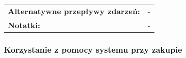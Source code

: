 \documentclass[a4paper,20pt]{article}
\begin{document}
\begin{center}
\begin{tabularx}{\textwidth}[t]{XX}
\quad \textbf{Alternatywne przepływy zdarzeń:} & 
\begin{minipage}[t]{\linewidth}%
-
\end{minipage}\\


\quad \textbf{Notatki:} & 
\begin{minipage}[t]{\linewidth}%
-
\end{minipage}\\


\end{tabularx}
\end{center}




\subsubsection{Korzystanie z pomocy systemu przy zakupie}
\end{document}
